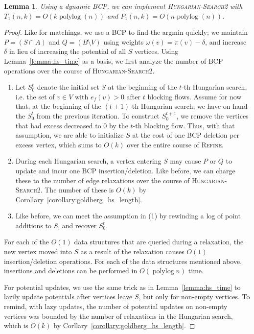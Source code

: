 \documentclass[11pt]{article}
\def\polylog{\mathop{\mathrm{polylog}}}
\theoremstyle{plain}
\newtheorem{lemma}{Lemma}
\begin{document}
\begin{lemma}
\label{lemma:goldberg_hs_time}
Using a dynamic BCP, we can implement \textsc{Hungarian-Search2} with
$T_1(n, k) = O(k\polylog(n))$ and $P_1(n, k) = O(n\polylog(n))$.
\end{lemma}

\begin{proof}
Like for matchings, we use a BCP to find the argmin quickly; we maintain
$P = (S \cap A)$ and $Q = (B \setminus V)$ using weights
$\omega(v) = \pi(v) - \delta$, and increase $\delta$ in lieu of increasing the
potential of all $S$ vertices.
Using Lemma~\ref{lemma:hs_time} as a basis, we first analyze the number of BCP
operations over the course of \textsc{Hungarian-Search2}.
\begin{enumerate}
\item Let $S^t_0$ denote the initial set $S$ at the beginning of the
	$t$-th Hungarian search, i.e. the set of $v \in V$ with
	$e_f(v) > 0$ after $t$ blocking flows.
	Assume for now that, at the beginning of the $(t+1)$-th
	Hungarian search, we have on hand the $S^t_0$ from the
	previous iteration.
	To construct $S^{t+1}_0$, we remove the vertices that had
	excess decreased to 0 by the $t$-th blocking flow.
	Thus, with that assumption, we are able to initialize $S$ at
	the cost of one BCP deletion per excess vertex, which sums to
	$O(k)$ over the entire course of \textsc{Refine}.
\item During each Hungarian search, a vertex entering $S$ may cause $P$
	or $Q$ to update and incur one BCP insertion/deletion.
	Like before, we can charge these to the number of edge
	relaxations over the course of \textsc{Hungarian-Search2}.
	The number of these is $O(k)$ by 
	Corollary~\ref{corollary:goldberg_hs_length}.
\item Like before, we can meet the assumption in (1) by rewinding a log
	of point additions to $S$, and recover $S^t_0$.
\end{enumerate}

For each of the $O(1)$ data structures that are queried during a relaxation,
the new vertex moved into $S$ as a result of the relaxation causes $O(1)$
insertion/deletion operations.
For each of the data structures mentioned above, insertions and deletions
can be performed in $O(\polylog n)$ time.

For potential updates, we use the same trick as in Lemma~\ref{lemma:hs_time} to
lazily update potentials after vertices leave $S$, but only for non-empty
vertices.
To remind, with lazy updates, the number of potential updates on non-empty
vertices was bounded by the number of relaxations in the Hungarian search,
which is $O(k)$ by Corllary~\ref{corollary:goldberg_hs_length}.


\end{proof}
\end{document}
